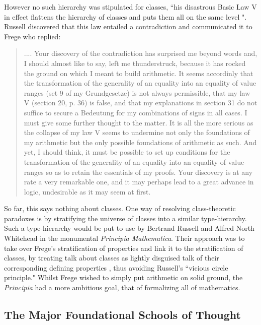 \documentclass[12p]{article}
\theoremstyle{definition}
\begin{document}
However no such hierarchy was stipulated for classes, ``his disastrous Basic Law V in effect flattens the hierarchy of classes and puts them all on the same level \cite{smith2013introduction}". Russell discovered that this law entailed a contradiction and communicated it to Frege who replied:
\begin{quote}
	.... Your discovery of the contradiction has surprised me beyond words and, I should almost like to say, left me thunderstruck, because it has rocked the ground on which I meant to build arithmetic. It seems accordinly that the transformation of the generality of an equality into an equality of value ranges (set 9 of my Grundgesetze) is not always permissible, that my law V (section 20, p. 36) is false, and that my explanations in section 31 do not suffice to secure a Bedeutung for my combinations of signs in all cases. I must give some further thought to the matter. It is all the more serious as the collapse of my law V seems to undermine not only the foundations of my arithmetic but the only possible foundations of arithmetic as such. And yet, I should think, it must be possible to set up conditions for the transformation of the generality of an equality into an equality of value-ranges so as to retain the essentials of my proofs. Your discovery is at any rate a very remarkable one, and it may perhaps lead to a great advance in logic, undesirable as it may seem at first.
\end{quote}
So far, this says nothing about classes. One way of resolving class-theoretic paradoxes is by stratifying the universe of classes into a similar type-hierarchy. Such a type-hierarchy would be put to use by Bertrand Russell and Alfred North Whitehead in the monumental \textit{Principia Mathematica}. Their approach was to take over Frege's stratification of properties and link it to the stratification of classes, by treating talk about classes as lightly disguised talk of their corresponding defining properties \cite{smith2013introduction}, thus avoiding Russell's ``vicious circle principle." Whilst Frege wished to simply put arithmetic on solid ground, the \textit{Principia} had a more ambitious goal, that of formalizing all of mathematics.

\subsection{The Major Foundational Schools of Thought}
\end{document}
